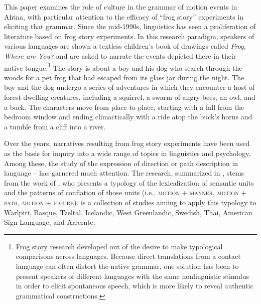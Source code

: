 This paper examines the role of culture in the grammar of motion events in Ahtna, with particular attention to the efficacy of “frog story” experiments in eliciting that grammar. Since the mid-1990s, linguistics has seen a proliferation of literature based on frog story experiments. In this research paradigm, speakers of various languages are shown a textless children’s book of drawings called \textit{Frog, Where are You?} \citep{Meyer1969} and are asked to narrate the events depicted there in their native tongue.\footnote{Frog story research developed out of the desire to make typological comparisons across languages. Because direct translations from a contact language can often distort the native grammar, one solution has been to present speakers of different languages with the same nonlinguistic stimulus in order to elicit spontaneous speech, which is more likely to reveal authentic grammatical constructions.} The story is about a boy and his dog who search through the woods for a pet frog that had escaped from its glass jar during the night. The boy and the dog undergo a series of adventures in which they encounter a host of forest dwelling creatures, including a squirrel, a swarm of angry bees, an owl, and a buck. The characters move from place to place, starting with a fall from the bedroom window and ending climactically with a ride atop the buck’s horns and a tumble from a cliff into a river.

Over the years, narratives resulting from frog story experiments have been used as the basis for inquiry into a wide range of topics in linguistics and psychology. Among these, the study of the expression of direction or path description in language – has garnered much attention. The research, summarized in \citet{Slobin2004}, stems from the work of  \citet{Talmy1985,Talmy1991,Talmy2000}, who presents a typology of the lexicalization of semantic units and the patterns of conflation of those units (i.e., \textsc{motion} \textsc{+} \textsc{manner,} \textsc{motion} \textsc{+} \textsc{path,} \textsc{motion} \textsc{+} \textsc{figure}). \citet{SV2004} is a collection of studies aiming to apply this typology to Warlpiri, Basque, Tzeltal, Icelandic, West Greenlandic, Swedish, Thai, American Sign Language, and Arrernte.

